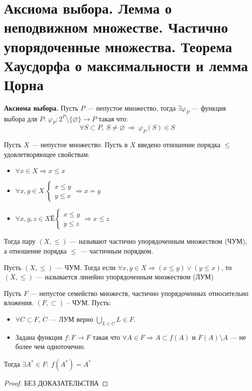 \newpage
\section{Аксиома выбора. Лемма о неподвижном множестве. Частично упорядоченные множества. Теорема Хаусдорфа о максимальности и лемма Цорна}

\textbf{Аксиома выбора.} Пусть $P$ --- непустое множество, тогда $\exists \varphi_P$ --- функция выбора для $P$:  $\varphi_P: 2^P\setminus \{\varnothing\} \rightarrow P$ такая что:
$$
~ \forall S \subset P, \ S \neq \varnothing ~\Rightarrow~ \varphi_P(S) \in S
$$
\begin{definition}
	\label{def:pos}
	Пусть $X$ --- непустое множество. Пусть в $X$ введено отношение порядка $\leq$ удовлетворяющее свойствам:	
	\begin{itemize}
		\item $\forall x \in X \Rightarrow x \leq x$
		\item $\forall x, y \in X ~\begin{cases}
			x \leq y \\
			y \leq x 
		\end{cases} \Rightarrow x = y $
		\item $\forall x,y,z \in X  Ё\begin{cases}
			x \leq y \\
			y \leq z 
		\end{cases} \Rightarrow x \leq z$
	\end{itemize}	
Тогда пару $(X, \leq)$ --- называют частично упорядоченным множеством (ЧУМ), а отношение порядка $\leq$ --- частичным порядком.
\end{definition}
\begin{definition}
	Пусть $(X,\leq)$ --- ЧУМ. Тогда если $\forall x,y \in X \Rightarrow (x \leq y) \vee (y \leq x)$, то $(X, \leq)$ --- называется линейно упорядоченным множеством (ЛУМ)
\end{definition}
\begin{lemma}
	Пусть $F$ --- непустое семейство множеств, частично упорядоченных относительно вложения. $(F, \subset )$ -- ЧУМ. Пусть:
	\begin{itemize}
		\item $\forall C \subset F$, $C$ --- ЛУМ верно $\bigcup\limits_{L \in C} L \in F$. 
		\item Задана функция $f: F \rightarrow F$ такая что $\forall A \in F \Rightarrow A \subset f(A)$ и $F(A) \setminus A$ --- не более чем одноточечно.
	\end{itemize}
Тогда $\exists A^*\in F:\ f(A^*) = A^*$
\end{lemma}
\begin{proof}
	БЕЗ ДОКАЗАТЕЛЬСТВА
\end{proof}

